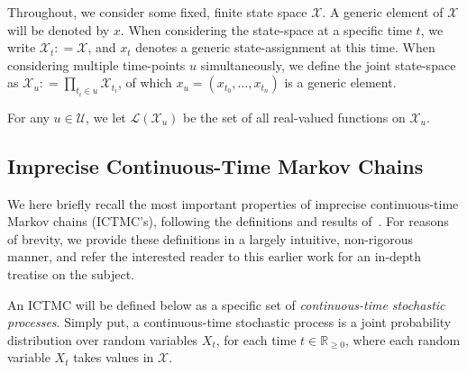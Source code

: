\documentclass[twoside,11pt]{article}
\newcommand{\reals}{\mathbb{R}}
\newcommand{\realsnonneg}{\reals_{\geq 0}}
\newcommand{\states}{\mathcal{X}}
\newcommand{\gambles}{\mathcal{L}}
\newcommand{\coloneqq}{:\!=}
\begin{document}
Throughout, we consider some fixed, finite state space $\states$. A generic element of $\states$ will be denoted by $x$. When considering the state-space at a specific time $t$, we write $\states_t\coloneqq\states$, and $x_t$ denotes a generic state-assignment at this time. When considering multiple time-points $u$ simultaneously, we define the joint state-space as $\states_u\coloneqq\prod_{t_i\in u}\states_{t_i}$, of which $x_u=(x_{t_0},\ldots,x_{t_n})$ is a generic element.

For any $u\in\mathcal{U}$, we let $\gambles(\states_u)$ be the set of all real-valued functions on $\states_u$.

\subsection{Imprecise Continuous-Time Markov Chains}\label{subsec:ictmc}

We here briefly recall the most important properties of imprecise continuous-time Markov chains (ICTMC's), following the definitions and results of~\citet{krak2016ictmc}. For reasons of brevity, we provide these definitions in a largely intuitive, non-rigorous manner, and refer the interested reader to this earlier work for an in-depth treatise on the subject.

An ICTMC will be defined below as a specific set of \emph{continuous-time stochastic processes}. Simply put, a continuous-time stochastic process is a joint probability distribution over random variables $X_t$, for each time $t\in\realsnonneg$, where each random variable $X_t$ takes values in $\states$. 


\end{document}

